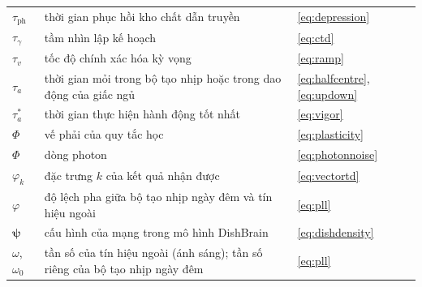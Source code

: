 \begin{center}
\begin{longtable}{>{\raggedright}p{2.0cm}>{\raggedright}p{9.6cm}>{\raggedright\arraybackslash}p{2.4cm}}
$\tau_{\text{ph}}$ & thời gian phục hồi kho chất dẫn truyền & \eqref{eq:depression} \\
$\tau_\gamma$ & tầm nhìn lập kế hoạch & \eqref{eq:ctd} \\
$\tau_v$ & tốc độ chính xác hóa kỳ vọng & \eqref{eq:ramp} \\
$\tau_a$ & thời gian mỏi trong bộ tạo nhịp hoặc trong dao động của giấc ngủ & \eqref{eq:halfcentre}, \eqref{eq:updown} \\
$\tau_a^*$ & thời gian thực hiện hành động tốt nhất & \eqref{eq:vigor} \\
$\Phi$ & vế phải của quy tắc học & \eqref{eq:plasticity} \\
$\Phi$ & dòng photon & \eqref{eq:photonnoise} \\
$\varphi_k$ & đặc trưng $k$ của kết quả nhận được & \eqref{eq:vectortd} \\
$\varphi$ & độ lệch pha giữa bộ tạo nhịp ngày đêm và tín hiệu ngoài & \eqref{eq:pll} \\
$\boldsymbol\psi$ & cấu hình của mạng trong mô hình DishBrain & \eqref{eq:dishdensity} \\
$\omega$, $\omega_0$ & tần số của tín hiệu ngoài (ánh sáng); tần số riêng của bộ tạo nhịp ngày đêm & \eqref{eq:pll} \\
\end{longtable}
\end{center}
